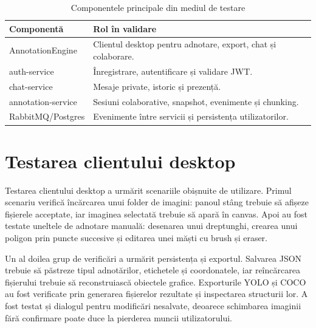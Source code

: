 \begin{table}[!htbp]
    \centering
    \small
    \begin{tabular}{p{} p{}}
        \hline
        Componentă & Rol în validare \\
        \hline
        AnnotationEngine & Clientul desktop pentru adnotare, export, chat și colaborare. \\
        auth-service & Înregistrare, autentificare și validare JWT. \\
        chat-service & Mesaje private, istoric și prezență. \\
        annotation-service & Sesiuni colaborative, snapshot, evenimente și chunking. \\
        RabbitMQ/Postgres & Evenimente între servicii și persistența utilizatorilor. \\
        \hline
    \end{tabular}
    \caption{Componentele principale din mediul de testare}
    \label{tab:mediu-testare}
\end{table}

\section{Testarea clientului desktop}

Testarea clientului desktop a urmărit scenariile obișnuite de utilizare. Primul scenariu verifică încărcarea unui folder de imagini: panoul stâng trebuie să afișeze fișierele acceptate, iar imaginea selectată trebuie să apară în canvas. Apoi au fost testate uneltele de adnotare manuală: desenarea unui dreptunghi, crearea unui poligon prin puncte succesive și editarea unei măști cu brush și eraser.

Un al doilea grup de verificări a urmărit persistența și exportul. Salvarea JSON trebuie să păstreze tipul adnotărilor, etichetele și coordonatele, iar reîncărcarea fișierului trebuie să reconstruiască obiectele grafice. Exporturile YOLO și COCO au fost verificate prin generarea fișierelor rezultate și inspectarea structurii lor. A fost testat și dialogul pentru modificări nesalvate, deoarece schimbarea imaginii fără confirmare poate duce la pierderea muncii utilizatorului.

